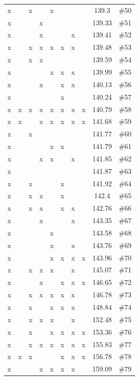 \begin{table}[H]
{\begin{tabular}{c c c c c c c c c c}
 x &  &  x &  &  x &  &  &  & 139.3 & \#50 \\
 x &  &  &  x &  &  &  &  & 139.33 & \#51 \\
 x &  &  &  x &  &  &  x &  & 139.41 & \#52 \\
 x &  &  x &  x &  x &  x &  x &  & 139.48 & \#53 \\
 x &  &  x &  x &  &  &  &  & 139.59 & \#54 \\
 x &  &  &  &  x &  x &  x &  & 139.99 & \#55 \\
 x &  &  &  x &  &  x &  x &  & 140.13 & \#56 \\
 x &  &  &  &  &  x &  &  & 140.24 & \#57 \\
 x &  x &  x &  x &  x &  x &  x &  x & 140.79 & \#58 \\
 x &  x &  &  x &  x &  x &  x &  x & 141.68 & \#59 \\
 x &  &  x &  &  &  &  &  & 141.77 & \#60 \\
 x &  &  &  &  x &  x &  &  & 141.79 & \#61 \\
 x &  &  &  x &  x &  &  x &  & 141.85 & \#62 \\
 x &  &  &  &  &  &  &  & 141.87 & \#63 \\
 x &  &  x &  &  &  x &  &  & 141.92 & \#64 \\
 x &  &  x &  x &  &  x &  &  & 142.4 & \#65 \\
 x &  &  x &  x &  &  x &  x &  & 142.76 & \#66 \\
 x &  &  &  x &  &  &  x &  & 143.35 & \#67 \\
 x &  &  &  &  x &  &  &  & 143.58 & \#68 \\
 x &  &  &  &  x &  &  x &  & 143.76 & \#69 \\
 x &  &  &  &  x &  x &  x &  x & 143.96 & \#70 \\
 x &  &  x &  x &  x &  &  x &  & 145.07 & \#71 \\
 x &  &  &  x &  &  x &  x &  x & 146.65 & \#72 \\
 x &  &  x &  x &  x &  x &  x &  & 146.78 & \#73 \\
 x &  &  x &  &  x &  x &  x &  & 148.84 & \#74 \\
 x &  &  x &  x &  x &  &  x &  & 152.48 & \#75 \\
 x &  &  x &  &  x &  x &  x &  x & 153.36 & \#76 \\
 x &  &  x &  x &  x &  x &  x &  x & 155.83 & \#77 \\
 x &  x &  x &  &  &  x &  x &  x & 156.78 & \#78 \\
 x &  &  &  x &  x &  x &  x &  & 159.09 & \#79 \\

\end{tabular}}
\end{table}
